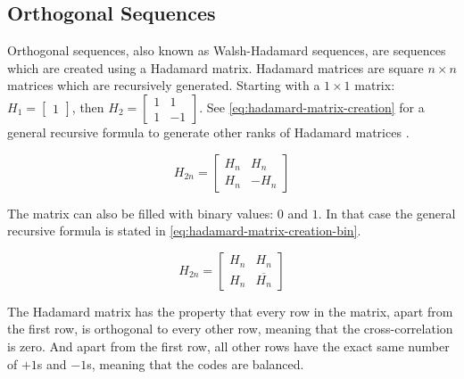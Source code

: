 
\subsection{Orthogonal Sequences}
\label{subsec:orthogonal-sequences}

Orthogonal sequences, also known as Walsh-Hadamard sequences, are sequences which are created using a Hadamard matrix.
Hadamard matrices are square $n \times n$ matrices which are recursively generated.
Starting with a $1 \times 1$ matrix: 
		$H_{1} = \begin{bmatrix} 1 \end{bmatrix}$, then 
		$H_{2} = \begin{bmatrix} 1 & 1 \\ 1 & -1 \end{bmatrix}$.
See \autoref{eq:hadamard-matrix-creation} for a general recursive formula to generate other ranks of Hadamard matrices \cite{714616}.

\begin{equation}
	H_{2n} = 
	\begin{bmatrix} 
		H_n & H_n \\ 
		H_n & -H_n 
	\end{bmatrix}
	\label{eq:hadamard-matrix-creation}
\end{equation}

The matrix can also be filled with binary values: $0$ and $1$. In that case the general recursive formula is stated in \autoref{eq:hadamard-matrix-creation-bin}. 

\begin{equation}
	H_{2n} = 
	\begin{bmatrix} 
		H_n & H_n \\ 
		H_n & \overline{H_n}
	\end{bmatrix}
	\label{eq:hadamard-matrix-creation-bin}
\end{equation}




The Hadamard matrix has the property that every row in the matrix, apart from the first row, is orthogonal to every other row, meaning that the cross-correlation is zero.
And apart from the first row, all other rows have the exact same number of $+1$s and $-1$s, meaning that the codes are balanced.

